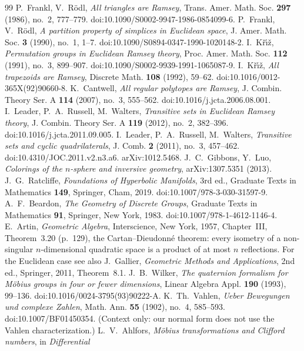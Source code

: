 \documentclass[11pt]{amsart}
\newcommand{\Kriz}{K\v{r}\'{\i}\v{z}}
\theoremstyle{plain}
\theoremstyle{definition}
\begin{document}
\begin{thebibliography}{99}
 P.~Frankl, V.~R\"odl, \emph{All triangles are Ramsey}, Trans. Amer. Math. Soc.
\textbf{297} (1986), no.~2, 777--779. doi:10.1090/S0002-9947-1986-0854099-6.
 P.~Frankl, V.~R\"odl, \emph{A partition property of simplices in Euclidean space}, J. Amer.
Math. Soc. \textbf{3} (1990), no.~1, 1--7. doi:10.1090/S0894-0347-1990-1020148-2.
 I.~\Kriz, \emph{Permutation groups in Euclidean Ramsey theory}, Proc. Amer. Math. Soc.
\textbf{112} (1991), no.~3, 899--907. doi:10.1090/S0002-9939-1991-1065087-9.
 I.~\Kriz, \emph{All trapezoids are Ramsey}, Discrete Math. \textbf{108} (1992), 59--62.
doi:10.1016/0012-365X(92)90660-8.
 K.~Cantwell, \emph{All regular polytopes are Ramsey}, J. Combin. Theory Ser. A \textbf{114}
(2007), no.~3, 555--562. doi:10.1016/j.jcta.2006.08.001.
 I.~Leader, P.~A.~Russell, M.~Walters, \emph{Transitive sets in Euclidean Ramsey theory},
J. Combin. Theory Ser. A \textbf{119} (2012), no.~2, 382--396. doi:10.1016/j.jcta.2011.09.005.
 I.~Leader, P.~A.~Russell, M.~Walters, \emph{Transitive sets and cyclic quadrilaterals},
J. Comb. \textbf{2} (2011), no.~3, 457--462. doi:10.4310/JOC.2011.v2.n3.a6. arXiv:1012.5468.
 J.~C.~Gibbons, Y.~Luo, \emph{Colorings of the $n$-sphere and inversive geometry},
arXiv:1307.5351 (2013).
 J.~G.~Ratcliffe, \emph{Foundations of Hyperbolic Manifolds}, 3rd ed., Graduate Texts in
Mathematics \textbf{149}, Springer, Cham, 2019. doi:10.1007/978-3-030-31597-9.
 A.~F.~Beardon, \emph{The Geometry of Discrete Groups}, Graduate Texts in Mathematics
\textbf{91}, Springer, New York, 1983. doi:10.1007/978-1-4612-1146-4.
 E.~Artin, \emph{Geometric Algebra}, Interscience, New York, 1957, Chapter~III, Theorem~3.20
(p.~129), the Cartan--Dieudonn\'e theorem: every isometry of a non-singular $n$-dimensional quadratic
space is a product of at most $n$ reflections. For the Euclidean case see also J.~Gallier,
\emph{Geometric Methods and Applications}, 2nd ed., Springer, 2011, Theorem~8.1.
 J.~B.~Wilker, \emph{The quaternion formalism for M\"obius groups in four or fewer
dimensions}, Linear Algebra Appl. \textbf{190} (1993), 99--136. doi:10.1016/0024-3795(93)90222-A.
 K.~Th.~Vahlen, \emph{Ueber Bewegungen und complexe Zahlen}, Math. Ann. \textbf{55} (1902),
no.~4, 585--593. doi:10.1007/BF01450354. (Context only: our normal form does not use the Vahlen
characterization.)
 L.~V.~Ahlfors, \emph{M\"obius transformations and Clifford numbers}, in \emph{Differential
}
\end{thebibliography}
\end{document}
